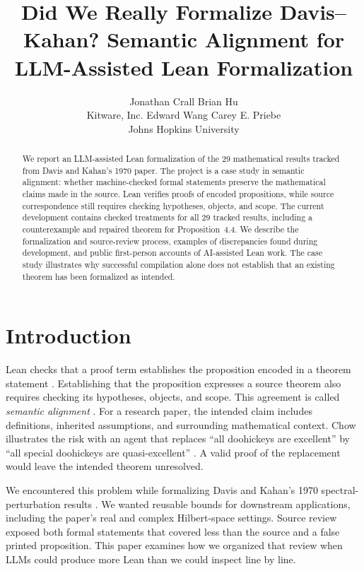 \documentclass{article}
\title{Did We Really Formalize Davis--Kahan? Semantic Alignment for LLM-Assisted Lean Formalization}
\author{%
  Jonathan Crall \quad Brian Hu \\
  Kitware, Inc.
  \And
  Edward Wang \quad Carey E. Priebe \\
  Johns Hopkins University
}
\date{}
\begin{document}
\maketitle

\begin{abstract}
We report an LLM-assisted Lean formalization of the 29 mathematical results
tracked from Davis and Kahan's 1970 paper.  The project is a case study in
semantic alignment: whether machine-checked formal statements preserve the
mathematical claims made in the source.  Lean verifies proofs of encoded
propositions, while source correspondence still requires checking hypotheses,
objects, and scope.  The current development contains checked treatments for
all 29 tracked results, including a counterexample and repaired theorem for
Proposition~4.4.  We describe the formalization and source-review process,
examples of discrepancies found during development, and
\PractitionerAccountCount{} public first-person accounts of AI-assisted Lean
work.  The case study illustrates why successful compilation alone does not
establish that an existing theorem has been formalized as intended.
\end{abstract}

\section{Introduction}

Lean checks that a proof term establishes the proposition encoded in a theorem
statement \citep{demoura2021lean4,mathlib2020}.  Establishing that the proposition
expresses a source theorem also requires checking its hypotheses, objects, and
scope.  This agreement is called \emph{semantic alignment}
\citep{lu2025formalalign}.  For a research paper, the intended claim includes
definitions, inherited assumptions, and surrounding mathematical context.
Chow illustrates the risk with an agent that replaces ``all doohickeys are
excellent'' by ``all special doohickeys are quasi-excellent''
\citep{chow2026mindreading}.  A valid proof of the replacement would leave the
intended theorem unresolved.

We encountered this problem while formalizing Davis and Kahan's 1970
spectral-perturbation results \citep{davis1970rotation}.  We wanted reusable
bounds for downstream applications, including the paper's real and complex
Hilbert-space settings.  Source review exposed both formal statements that
covered less than the source and a false printed proposition.  This paper
examines how we organized that review when LLMs could produce more Lean than
we could inspect line by line.
\end{document}
